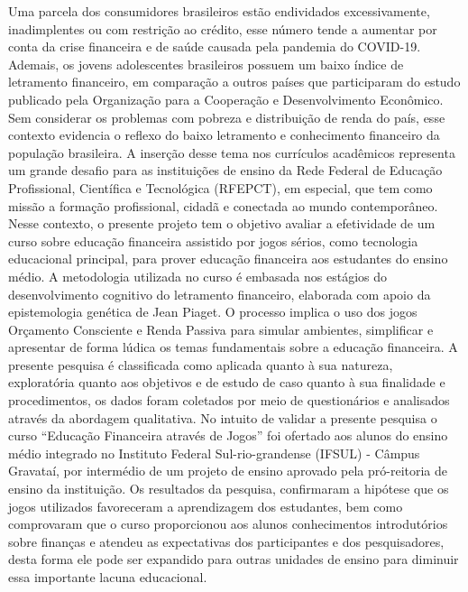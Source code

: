 Uma parcela dos consumidores brasileiros estão endividados excessivamente, inadimplentes ou com restrição ao crédito, esse número tende a aumentar por conta da crise financeira e de saúde causada pela pandemia do COVID-19. Ademais, os jovens adolescentes brasileiros possuem um baixo índice de letramento financeiro, em comparação a outros países que participaram do estudo publicado pela Organização para a Cooperação e Desenvolvimento Econômico. Sem considerar os problemas com pobreza e distribuição de renda do país, esse contexto evidencia o reflexo do baixo letramento e conhecimento financeiro da população brasileira. A inserção desse tema nos currículos acadêmicos representa um grande desafio para as instituições de ensino da Rede Federal de Educação Profissional, Científica e Tecnológica (RFEPCT), em especial, que tem como missão a formação profissional, cidadã e conectada ao mundo contemporâneo. Nesse contexto, o presente projeto tem o objetivo avaliar a efetividade de um curso sobre educação financeira assistido por jogos sérios, como tecnologia educacional principal, para prover educação financeira aos estudantes do ensino médio. A metodologia utilizada no curso é embasada nos estágios do desenvolvimento cognitivo do letramento financeiro, elaborada com apoio da epistemologia genética de Jean Piaget. O processo implica o uso dos jogos Orçamento Consciente e Renda Passiva para simular ambientes, simplificar e apresentar de forma lúdica os temas fundamentais sobre a educação financeira. A presente pesquisa é classificada como aplicada quanto à sua natureza, exploratória quanto aos objetivos e de estudo de caso quanto à sua finalidade e procedimentos, os dados foram coletados por meio de questionários e analisados através da abordagem qualitativa. No intuito de validar a presente pesquisa o curso “Educação Financeira através de Jogos” foi ofertado aos alunos do ensino médio integrado no Instituto Federal Sul-rio-grandense (IFSUL) - Câmpus Gravataí, por intermédio de um projeto de ensino aprovado pela pró-reitoria de ensino da instituição. Os resultados da pesquisa, confirmaram a hipótese que os jogos utilizados favoreceram a aprendizagem dos estudantes, bem como comprovaram que o curso proporcionou aos alunos conhecimentos introdutórios sobre finanças e atendeu as expectativas dos participantes e dos pesquisadores, desta forma ele pode ser expandido para outras unidades de ensino para diminuir essa importante lacuna educacional.